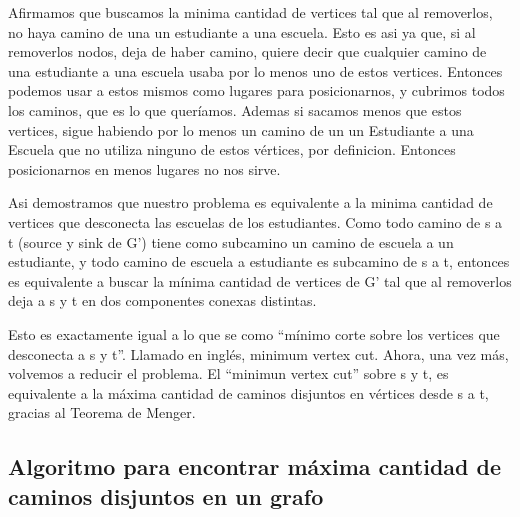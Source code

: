 \par{Afirmamos que buscamos la minima cantidad de vertices tal que al removerlos, no haya camino de una un estudiante a una escuela. 
Esto es asi ya que, si al removerlos nodos, deja de haber camino, quiere decir que cualquier camino de una estudiante a una escuela usaba por lo menos uno de estos vertices. 
Entonces podemos usar a estos mismos como lugares para posicionarnos, y cubrimos todos los caminos, que es lo que queríamos. Ademas si sacamos menos que estos vertices, sigue habiendo por lo menos un camino de un un Estudiante  a una Escuela que no utiliza ninguno de estos vértices, por definicion. Entonces posicionarnos en menos lugares no nos sirve. }
\par{
Asi demostramos que nuestro problema es equivalente a la minima cantidad de vertices que desconecta las escuelas de los estudiantes. 
Como todo camino de s a t (source y sink de G’) tiene como subcamino un camino de escuela a un estudiante, y todo camino de escuela a estudiante es subcamino de s a t, entonces es equivalente a buscar la mínima cantidad de vertices de G’ tal que al removerlos deja a s y t en dos componentes conexas distintas.}
\par{
Esto es exactamente igual a lo que se como “mínimo corte sobre los vertices que desconecta a s y t”. Llamado en inglés, minimum vertex cut.
Ahora, una vez más, volvemos a reducir el problema. El “minimun vertex cut”  sobre s y t, es equivalente a la máxima cantidad de caminos disjuntos en vértices desde s a t, gracias al Teorema de Menger.}

\subsection{Algoritmo para encontrar máxima cantidad de caminos disjuntos en un grafo}

